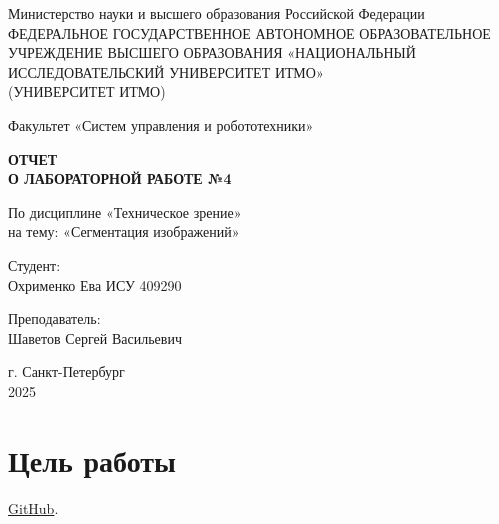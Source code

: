\documentclass[a4paper,12pt]{article}
\begin{document}
\begin{titlepage}
    \centering
    \vspace*{1cm}

    {\large Министерство науки и высшего образования Российской Федерации}\\
    {\large ФЕДЕРАЛЬНОЕ ГОСУДАРСТВЕННОЕ АВТОНОМНОЕ ОБРАЗОВАТЕЛЬНОЕ УЧРЕЖДЕНИЕ ВЫСШЕГО ОБРАЗОВАНИЯ «НАЦИОНАЛЬНЫЙ ИССЛЕДОВАТЕЛЬСКИЙ УНИВЕРСИТЕТ ИТМО»}\\
    {\large (УНИВЕРСИТЕТ ИТМО)}\\

    \vspace{2cm}

    {\large Факультет «Систем управления и робототехники»}\\

    \vspace{3cm}

    \textbf{{\Huge ОТЧЕТ}\\
    {\Huge О ЛАБОРАТОРНОЙ РАБОТЕ №4}}\\

    \vspace{1cm}

    {\LARGE По дисциплине «Техническое зрение»}\\
    {\LARGE на тему: «Сегментация изображений»}\\

    \vspace{2cm}

    {\Large Студент:}\\
    Охрименко Ева ИСУ 409290\\

    \vspace{2cm}

    {\Large Преподаватель:}\\
    Шаветов Сергей Васильевич\\

    \vspace{4cm}

    {\large г. Санкт-Петербург}\\
    {\large 2025}

\end{titlepage}

\tableofcontents  %
\newpage

\section{Цель работы}


\href{https://github.com/decadeos/ITMO/tree/master/2_course/texViz/lab4}{GitHub}.
\end{document}
